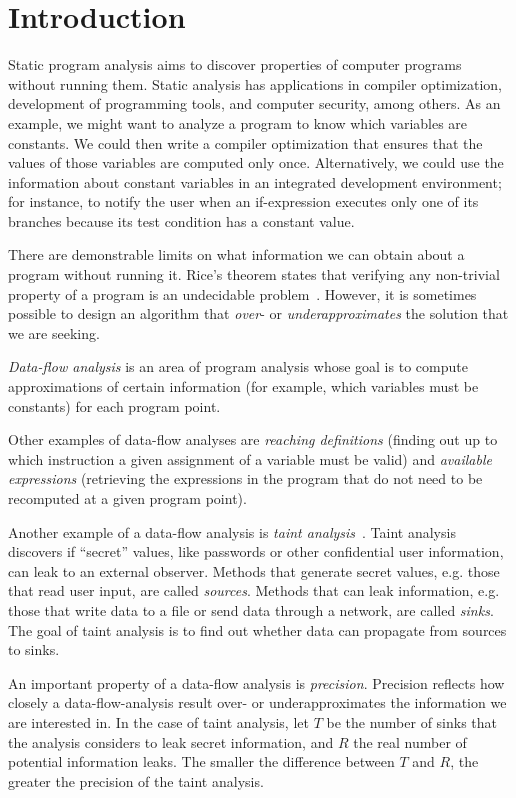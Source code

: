 \section{Introduction}
Static program analysis aims to discover properties of computer programs without running them.
Static analysis has applications in compiler optimization, development of programming tools, and computer security, among others.
As an example, we might want to analyze a program to know which variables are constants. 
We could then write a compiler optimization that ensures that the values of those variables are computed only once.
Alternatively, we could use the information about constant variables in an integrated development environment; for instance, to notify the user when an if-expression executes only one of its branches because its test condition has a constant value.

There are demonstrable limits on what information we can obtain about a program without running it.
Rice's theorem states that verifying any non-trivial property of a program is an undecidable problem~\cite{rice1953classes}. However, it is sometimes possible to design an algorithm that \textit{over}- or \textit{underapproximates} the solution that we are seeking.

\textit{Data-flow analysis} is an area of program analysis whose goal is to compute approximations of certain information (for example, which variables must be constants) for each program point. 

Other examples of data-flow analyses are \textit{reaching definitions} (finding out up to which instruction a given assignment of a variable must be valid) and \textit{available expressions} (retrieving the expressions in the program that do not need to be recomputed at a given program point).

Another example of a data-flow analysis is \textit{taint analysis}~\cite{tripp2009taj}. Taint analysis discovers if ``secret'' values, like passwords or other confidential user information, can leak to an external observer. Methods that generate secret values, e.g. those that read user input, are called \textit{sources}. Methods that can leak information, e.g. those that write data to a file or send data through a network, are called \textit{sinks}. The goal of taint analysis is to find out whether data can propagate from sources to sinks.

An important property of a data-flow analysis is \textit{precision}.
Precision reflects how closely a data-flow-analysis result over- or underapproximates the information we are interested in. In the case of taint analysis, let $T$ be the number of sinks that the analysis considers to leak secret information, and $R$ the real number of potential information leaks. The smaller the difference between $T$ and $R$, the greater the precision of the taint analysis.

